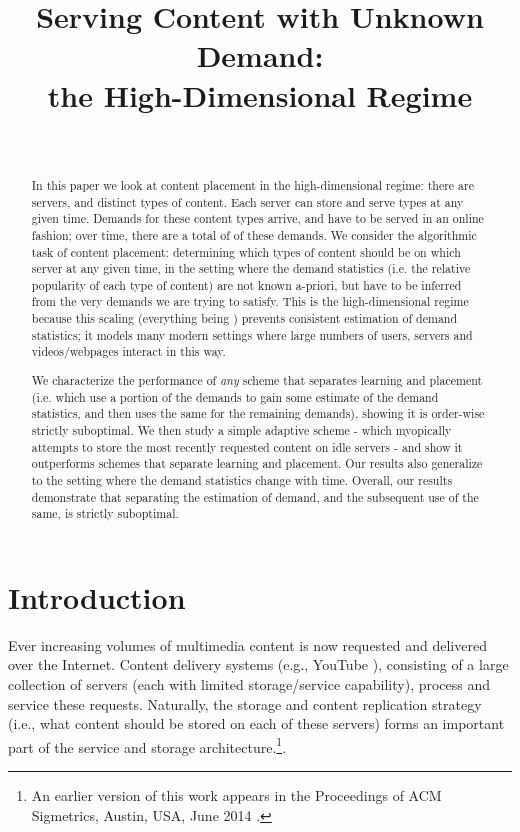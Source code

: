 \documentclass[10pt, conference, letterpaper]{IEEEtran}
\begin{document}
\title{Serving Content with Unknown Demand:\\ the High-Dimensional Regime}
\author{
	 \\
}


\maketitle

\begin{abstract}
In this paper we look at content placement in the high-dimensional regime: there are  servers, and  distinct types of content. Each server can store and serve  types at any given time. Demands for these content types arrive, and have to be served in an online fashion; over time, there are a total of  of these demands. We consider the algorithmic task of content placement: determining which types of content should be on which server at any given time, in the setting where the demand statistics (i.e. the relative popularity of each type of content) are not known a-priori, but have to be inferred from the very demands we are trying to satisfy. This is the high-dimensional regime because this scaling (everything being ) prevents consistent estimation of demand statistics; it models many modern settings where large numbers of users, servers and videos/webpages interact in this way.

We characterize the performance of \textit{any} scheme that separates learning and placement (i.e. which use a portion of the demands to gain some estimate of the demand statistics, and then uses the same for the remaining demands), showing it is order-wise strictly suboptimal. We then study a simple adaptive scheme - which myopically attempts to store the most recently requested content on idle servers - and show it outperforms schemes that separate learning and placement. Our results also generalize to the setting where the demand statistics change with time. Overall, our results demonstrate that separating the estimation of demand, and the subsequent use of the same, is strictly suboptimal.
\end{abstract}

\section{Introduction}
\label{sec:intro}

Ever increasing volumes of multimedia content is now requested and
delivered over the Internet. Content delivery systems (e.g., YouTube
\cite{Youtube}), consisting of a large collection of servers (each
with limited storage/service capability), process and service these
requests. Naturally, the storage and content replication strategy
(i.e., what content should be stored on each of these servers) forms an
important part of the service and storage architecture.\footnote{An earlier version of this work appears in the
	Proceedings of ACM Sigmetrics, Austin, USA, June 2014
	\cite{SGSS14}.}.
\end{document}
